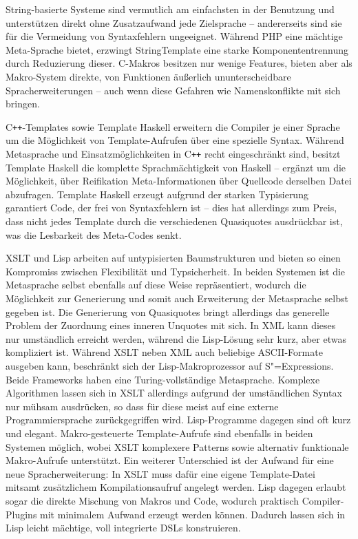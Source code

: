 \documentclass[11pt, a4paper, bibgerm]{scrbook}
\newcommand{\sexps}{S"=Expressions}
\newcommand{\cpp}{C\texttt{++}}
\begin{document}
String-basierte Systeme sind vermutlich am einfachsten in der Benutzung
und unterstützen direkt ohne Zusatzaufwand jede Zielsprache --
andererseits sind sie für die Vermeidung von Syntaxfehlern
ungeeignet. Während PHP eine mächtige Meta-Sprache bietet, erzwingt
StringTemplate eine starke Komponententrennung durch Reduzierung
dieser. C-Makros besitzen nur wenige Features, bieten aber als
Makro-System direkte, von Funktionen äußerlich ununterscheidbare
Spracherweiterungen -- auch wenn diese Gefahren wie Namenskonflikte mit
sich bringen.

\cpp{}-Templates sowie Template Haskell erweitern die Compiler je einer
Sprache um die Möglichkeit von Template-Aufrufen über eine spezielle
Syntax. Während Metasprache und Einsatzmöglichkeiten in \cpp{} recht
eingeschränkt sind, besitzt Template Haskell die komplette Sprachmächtigkeit
von Haskell -- ergänzt um die Möglichkeit, über Reifikation
Meta-Informationen über Quellcode derselben Datei abzufragen. Template
Haskell erzeugt aufgrund der starken Typisierung garantiert Code, der
frei von Syntaxfehlern ist -- dies hat allerdings zum Preis, dass nicht
jedes Template durch die verschiedenen Quasiquotes ausdrückbar ist, was
die Lesbarkeit des Meta-Codes senkt.

XSLT und Lisp arbeiten auf untypisierten Baumstrukturen und bieten so
einen Kompromiss zwischen Flexibilität und Typsicherheit. In beiden
Systemen ist die Metasprache selbst ebenfalls auf diese Weise
repräsentiert, wodurch die Möglichkeit zur Generierung und somit auch
Erweiterung der Metasprache selbst gegeben ist. Die Generierung von
Quasiquotes bringt allerdings das generelle Problem der Zuordnung eines
inneren Unquotes mit sich. In XML kann dieses nur umständlich erreicht
werden, während die Lisp-Lösung sehr kurz, aber etwas kompliziert
ist. Während XSLT neben XML auch beliebige ASCII-Formate ausgeben kann,
beschränkt sich der Lisp-Makroprozessor auf \sexps{}. Beide Frameworks
haben eine Turing-vollständige Metasprache. Komplexe Algorithmen lassen
sich in XSLT allerdings aufgrund der umständlichen Syntax nur mühsam
ausdrücken, so dass für diese meist auf eine externe Programmiersprache
zurückgegriffen wird. Lisp-Programme dagegen sind oft kurz und
elegant. Makro-gesteuerte Template-Aufrufe sind ebenfalls in beiden
Systemen möglich, wobei XSLT komplexere Patterns sowie alternativ
funktionale Makro-Aufrufe unterstützt. Ein weiterer Unterschied ist der
Aufwand für eine neue Spracherweiterung: In XSLT muss dafür eine eigene
Template-Datei mitsamt zusätzlichem Kompilationsaufruf angelegt
werden. Lisp dagegen erlaubt sogar die direkte Mischung von Makros und
Code, wodurch praktisch Compiler-Plugins mit minimalem Aufwand erzeugt
werden können. Dadurch lassen sich in Lisp leicht mächtige, voll
integrierte DSLs konstruieren.
\end{document}
